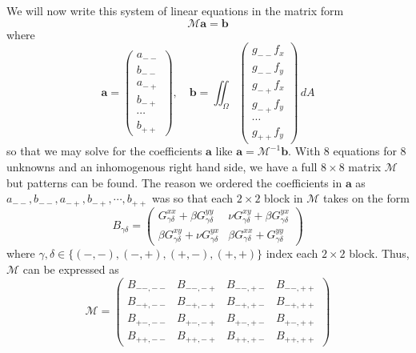 \documentclass[11pt]{article}
\begin{document}
We will now write this system of linear equations in the matrix form
\begin{equation}
\mathcal{M}\bm{a} = \bm{b}
\end{equation}
where
\begin{equation}
  \bm{a} =
    \begin{pmatrix}
      a_{--} \\
      b_{--} \\
      a_{-+} \\
      b_{-+} \\
      \cdots \\
      b_{++}
    \end{pmatrix}
  , \quad
  \bm{b} = \iint_\Omega
    \begin{pmatrix}
      g_{--}f_x \\
      g_{--}f_y \\
      g_{-+}f_x \\
      g_{-+}f_y \\
      \cdots \\
      g_{++}f_y
    \end{pmatrix}  
  \, dA
\end{equation}
so that we may solve for the coefficients $\bm{a}$ like $\bm{a} = \mathcal{M}^{-1}\bm{b}$. With 8 equations for 8 unknowns and an inhomogenous right hand side, we have a full $8\times8$ matrix $\mathcal{M}$ but patterns can be found. The reason we ordered the coefficients in $\bm{a}$ as $a_{--}, b_{--}, a_{-+}, b_{-+}, \cdots, b_{++}$ was so that each $2\times2$ block in $\mathcal{M}$ takes on the form
\begin{equation}
  B_{\gamma\delta} =
  \begin{pmatrix}
    G_{\gamma\delta}^{xx} + \beta G_{\gamma\delta}^{yy}
      & \nu G_{\gamma\delta}^{xy} + \beta G_{\gamma\delta}^{yx} \\
    \beta G_{\gamma\delta}^{xy} + \nu G_{\gamma\delta}^{yx}
      & \beta G_{\gamma\delta}^{xx} + G_{\gamma\delta}^{yy}
    \end{pmatrix}
\end{equation}
where $\gamma,\delta \in \{(-,-), (-,+), (+,-), (+,+) \}$ index each $2\times2$ block. Thus, $\mathcal{M}$ can be expressed as
\begin{equation} \label{eq:MmatrixB}
  \mathcal{M} =
  \begin{pmatrix}
    B_{--,--} & B_{--,-+} & B_{--,+-} & B_{--,++} \\
    B_{-+,--} & B_{-+,-+} & B_{-+,+-} & B_{-+,++} \\
    B_{+-,--} & B_{+-,-+} & B_{+-,+-} & B_{+-,++} \\
    B_{++,--} & B_{++,-+} & B_{++,+-} & B_{++,++}
  \end{pmatrix}
\end{equation}
\end{document}
